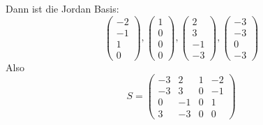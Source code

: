 \documentclass{article} %
\begin{document}
Dann ist die Jordan Basis: 
\[
\begin{pmatrix}
-2 \\ -1 \\ 1 \\0 
\end{pmatrix},
\begin{pmatrix}
1\\0\\0\\0
\end{pmatrix}, \begin{pmatrix}
 2\\3\\-1\\-3
\end{pmatrix}, 
\begin{pmatrix}
-3\\-3\\0\\-3
\end{pmatrix}
\]
Also
\[
S = \begin{pmatrix}
-3 & 2 & 1 & -2 \\
-3 & 3 & 0 & -1 \\
0 & -1 & 0 & 1 \\
3 & -3 & 0 & 0
\end{pmatrix}
\]
\end{document}
